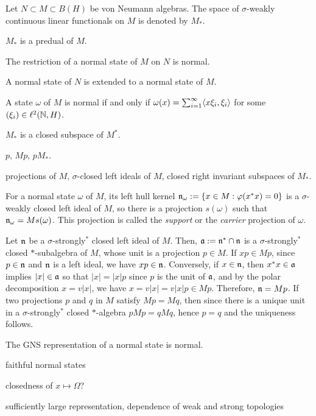 \documentclass{../../large}
\begin{document}
\begin{prb}
Let $N\subset M\subset B(H)$ be von Neumann algebras.
The space of $\sigma$-weakly continuous linear functionals on $M$ is denoted by $M_*$.
\begin{parts}
\item $M_*$ is a predual of $M$.
\item The restriction of a normal state of $M$ on $N$ is normal.
\item A normal state of $N$ is extended to a normal state of $M$.
\item A state $\omega$ of $M$ is normal if and only if $\omega(x)=\sum_{i=1}^\infty\langle x\xi_i,\xi_i\rangle$ for some $(\xi_i)\in\ell^2(\mathbb{N},H)$.
\item $M_*$ is a closed subspace of $M^*$.
\end{parts}
\end{prb}


\begin{prb}
$p$, $Mp$, $pM_*$.
\begin{parts}
\item projections of $M$, $\sigma$-closed left ideals of $M$, closed right invariant subspaces of $M_*$.
\item For a normal state $\omega$ of $M$, its left hull kernel $\mathfrak{n}_\omega:=\{x\in M:\varphi(x^*x)=0\}$ is a $\sigma$-weakly closed left ideal of $M$, so there is a projection $s(\omega)$ such that $\mathfrak{n}_\omega=Ms(\omega)$. This projection is called the \emph{support} or the \emph{carrier} projection of $\omega$.
\end{parts}
\end{prb}
\begin{pf}
Let $\mathfrak{n}$ be a $\sigma$-strongly$^*$ closed left ideal of $M$.
Then, $\mathfrak{a}:=\mathfrak{n}^*\cap\mathfrak{n}$ is a $\sigma$-strongly$^*$ closed $*$-subalgebra of $M$, whose unit is a projection $p\in M$.
If $xp\in Mp$, since $p\in\mathfrak{n}$ and $\mathfrak{n}$ is a left ideal, we have $xp\in\mathfrak{n}$.
Conversely, if $x\in\mathfrak{n}$, then $x^*x\in\mathfrak{a}$ implies $|x|\in\mathfrak{a}$ so that $|x|=|x|p$ since $p$ is the unit of $\mathfrak{a}$, and by the polar decomposition $x=v|x|$, we have $x=v|x|=v|x|p\in Mp$.
Therefore, $\mathfrak{n}=Mp$.
If two projections $p$ and $q$ in $M$ satisfy $Mp=Mq$, then since there is a unique unit in a $\sigma$-strongly$^*$ closed $*$-algebra $pMp=qMq$, hence $p=q$ and the uniqueness follows.

\end{pf}



\begin{prb}
\begin{parts}
\item The GNS representation of a normal state is normal.
\item faithful normal states
\item closedness of $x\mapsto\Omega$?
\item sufficiently large representation, dependence of weak and strong topologies
\end{parts}
\end{prb}
\end{document}
